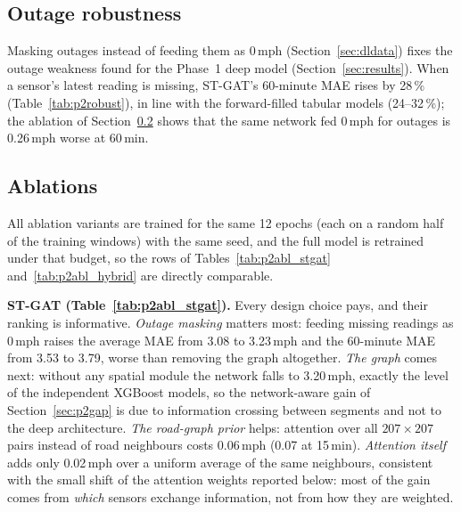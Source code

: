 \subsection{Outage robustness}

Masking outages instead of feeding them as 0\,mph (Section~\ref{sec:dldata}) fixes
the outage weakness found for the Phase~1 deep model (Section~\ref{sec:results}). When
a sensor's latest reading is missing, ST-GAT's 60-minute MAE rises by 28\,\%
(Table~\ref{tab:p2robust}), in line with the forward-filled tabular models
(24--32\,\%); the ablation of Section~\ref{sec:p2abl} shows that the same network fed
0\,mph for outages is 0.26\,mph worse at 60\,min.

\subsection{Ablations}
\label{sec:p2abl}
All ablation variants are trained for the same 12 epochs (each on a random half of
the training windows) with the same seed, and the full model is retrained under that
budget, so the rows of Tables~\ref{tab:p2abl_stgat} and~\ref{tab:p2abl_hybrid} are
directly comparable.




\textbf{ST-GAT (Table~\ref{tab:p2abl_stgat}).} Every design choice pays, and their
ranking is informative. \emph{Outage masking} matters most: feeding missing readings
as 0\,mph raises the average MAE from 3.08 to 3.23\,mph and the 60-minute MAE from
3.53 to 3.79, worse than removing the graph altogether. \emph{The graph} comes next:
without any spatial module the network falls to 3.20\,mph, exactly the level of the
independent XGBoost models, so the network-aware gain of Section~\ref{sec:p2gap} is
due to information crossing between segments and not to the deep architecture.
\emph{The road-graph prior} helps: attention over all $207{\times}207$ pairs instead of
road neighbours costs 0.06\,mph (0.07 at 15\,min). \emph{Attention itself} adds only
0.02\,mph over a uniform average of the same neighbours, consistent with the small
shift of the attention weights reported below: most of the gain comes from
\emph{which} sensors exchange information, not from how they are weighted.

